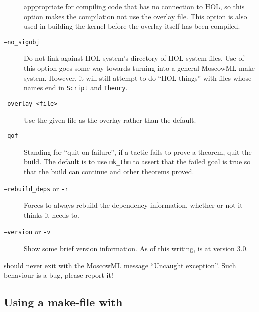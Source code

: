 \begin{description}
  apppropriate for compiling code that has no connection to HOL, so
  this option makes the compilation not use the overlay file.  This
  option is also used in building the kernel before the overlay itself
  has been compiled.
\item[\texttt{--no\_sigobj}] Do not link against HOL system's
  directory of HOL system files.  Use of this option goes some way
  towards turning
  \holmake{} into a general MoscowML \textsf{make} system.  However,
  it will still attempt to do ``HOL things'' with files whose names
  end in \texttt{Script} and \texttt{Theory}.
\item[\texttt{--overlay <file>}] Use the given file as the overlay
  rather than the default.
\item[\texttt{--qof}] Standing for ``quit on failure'', if a tactic
  fails to prove a theorem, quit the build.  The default is to use
  \texttt{mk\_thm} to assert that the failed goal is true so that the
  build can continue and other theorems proved.
\item[{\tt --rebuild\_deps} or {\tt -r}] Forces \holmake{} to
  always rebuild the dependency information, whether or not it thinks
  it needs to.
\item[{\tt --version} or {\tt -v}] Show some brief version
  information.  As of this writing, \holmake{} is at version 3.0.
\end{description}

\noindent \holmake{} should never exit with the MoscowML message ``Uncaught
exception''.  Such behaviour is a bug, please report it!


\subsection{Using a make-file with \holmake}
\label{sec:using-Holmakefiles}

